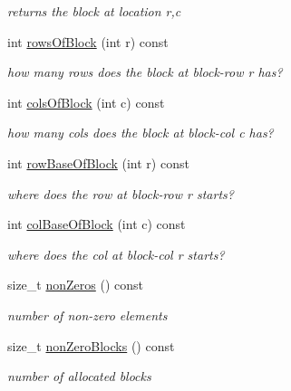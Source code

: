 \begin{DoxyCompactItemize}
\begin{DoxyCompactList}\small\item\em returns the block at location r,c \end{DoxyCompactList}\item 
int \mbox{\hyperlink{classg2o_1_1_sparse_block_matrix_a637d4a6d2d6f444be55a158497c8a07c}{rows\+Of\+Block}} (int r) const
\begin{DoxyCompactList}\small\item\em how many rows does the block at block-\/row r has? \end{DoxyCompactList}\item 
int \mbox{\hyperlink{classg2o_1_1_sparse_block_matrix_afe3ef87aecd7a76eab27e91131dbe0c1}{cols\+Of\+Block}} (int c) const
\begin{DoxyCompactList}\small\item\em how many cols does the block at block-\/col c has? \end{DoxyCompactList}\item 
int \mbox{\hyperlink{classg2o_1_1_sparse_block_matrix_af718590d044a1b44e4079136c29efcd1}{row\+Base\+Of\+Block}} (int r) const
\begin{DoxyCompactList}\small\item\em where does the row at block-\/row r starts? \end{DoxyCompactList}\item 
int \mbox{\hyperlink{classg2o_1_1_sparse_block_matrix_a502857f0a792ad37055964705a983590}{col\+Base\+Of\+Block}} (int c) const
\begin{DoxyCompactList}\small\item\em where does the col at block-\/col r starts? \end{DoxyCompactList}\item 
size\+\_\+t \mbox{\hyperlink{classg2o_1_1_sparse_block_matrix_a06dc97167a923119bdf99818033104d8}{non\+Zeros}} () const
\begin{DoxyCompactList}\small\item\em number of non-\/zero elements \end{DoxyCompactList}\item 
size\+\_\+t \mbox{\hyperlink{classg2o_1_1_sparse_block_matrix_a3f9e289e4039e668d33ad565a637e39a}{non\+Zero\+Blocks}} () const
\begin{DoxyCompactList}\small\item\em number of allocated blocks \end{DoxyCompactList}\item 

\end{DoxyCompactItemize}
